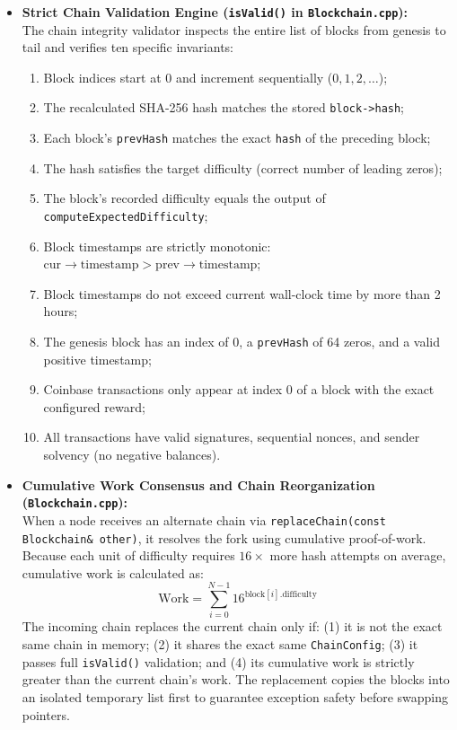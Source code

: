 \documentclass[11pt,a4paper]{report}
\begin{document}
\begin{itemize}
    \item \textbf{Strict Chain Validation Engine (\texttt{isValid()} in \texttt{Blockchain.cpp}):}\\
    The chain integrity validator inspects the entire list of blocks from genesis to tail and verifies ten specific invariants:
    \begin{enumerate}
        \item Block indices start at 0 and increment sequentially ($0, 1, 2, \dots$);
        \item The recalculated SHA-256 hash matches the stored \texttt{block->hash};
        \item Each block's \texttt{prevHash} matches the exact \texttt{hash} of the preceding block;
        \item The hash satisfies the target difficulty (correct number of leading zeros);
        \item The block's recorded difficulty equals the output of \texttt{computeExpectedDifficulty};
        \item Block timestamps are strictly monotonic: $\text{cur}\to\text{timestamp} > \text{prev}\to\text{timestamp}$;
        \item Block timestamps do not exceed current wall-clock time by more than 2 hours;
        \item The genesis block has an index of 0, a \texttt{prevHash} of 64 zeros, and a valid positive timestamp;
        \item Coinbase transactions only appear at index 0 of a block with the exact configured reward;
        \item All transactions have valid signatures, sequential nonces, and sender solvency (no negative balances).
    \end{enumerate}

    \item \textbf{Cumulative Work Consensus and Chain Reorganization (\texttt{Blockchain.cpp}):}\\
    When a node receives an alternate chain via \texttt{replaceChain(const Blockchain\& other)}, it resolves the fork using cumulative proof-of-work. Because each unit of difficulty requires $16\times$ more hash attempts on average, cumulative work is calculated as:
    \begin{equation}
        \text{Work} = \sum_{i=0}^{N-1} 16^{\text{block}[i].\text{difficulty}}
    \end{equation}
    The incoming chain replaces the current chain only if: (1) it is not the exact same chain in memory; (2) it shares the exact same \texttt{ChainConfig}; (3) it passes full \texttt{isValid()} validation; and (4) its cumulative work is strictly greater than the current chain's work. The replacement copies the blocks into an isolated temporary list first to guarantee exception safety before swapping pointers.


\end{itemize}
\end{document}
